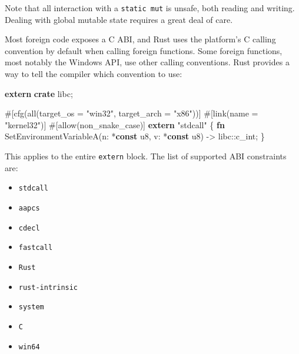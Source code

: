\documentclass[a4paper,]{book}
\newenvironment{Shaded}{\begin{snugshade}}{\end{snugshade}}
\newcommand{\KeywordTok}[1]{\textcolor[rgb]{0.13,0.29,0.53}{\textbf{{#1}}}}
\newcommand{\DataTypeTok}[1]{\textcolor[rgb]{0.13,0.29,0.53}{{#1}}}
\newcommand{\StringTok}[1]{\textcolor[rgb]{0.31,0.60,0.02}{{#1}}}
\newcommand{\AttributeTok}[1]{\textcolor[rgb]{0.77,0.63,0.00}{{#1}}}
\newcommand{\NormalTok}[1]{{#1}}
\providecommand{\tightlist}{%
  \setlength{\itemsep}{0pt}\setlength{\parskip}{0pt}}
\begin{document}
Note that all interaction with a \texttt{static\ mut} is unsafe, both
reading and writing. Dealing with global mutable state requires a great
deal of care.


Most foreign code exposes a C ABI, and Rust uses the platform's C
calling convention by default when calling foreign functions. Some
foreign functions, most notably the Windows API, use other calling
conventions. Rust provides a way to tell the compiler which convention
to use:

\begin{Shaded}
\begin{Highlighting}[]
\KeywordTok{extern} \KeywordTok{crate} \NormalTok{libc;}

\AttributeTok{#[}\NormalTok{cfg}\AttributeTok{(}\NormalTok{all}\AttributeTok{(}\NormalTok{target_os }\AttributeTok{=} \StringTok{"win32"}\AttributeTok{,} \NormalTok{target_arch }\AttributeTok{=} \StringTok{"x86"}\AttributeTok{))]}
\AttributeTok{#[}\NormalTok{link}\AttributeTok{(}\NormalTok{name }\AttributeTok{=} \StringTok{"kernel32"}\AttributeTok{)]}
\AttributeTok{#[}\NormalTok{allow}\AttributeTok{(}\NormalTok{non_snake_case}\AttributeTok{)]}
\KeywordTok{extern} \StringTok{"stdcall"} \NormalTok{\{}
    \KeywordTok{fn} \NormalTok{SetEnvironmentVariableA(n: *}\KeywordTok{const} \DataTypeTok{u8}\NormalTok{, v: *}\KeywordTok{const} \DataTypeTok{u8}\NormalTok{) -> libc::}\DataTypeTok{c_int}\NormalTok{;}
\NormalTok{\}}
\end{Highlighting}
\end{Shaded}

This applies to the entire \texttt{extern} block. The list of supported
ABI constraints are:

\begin{itemize}
\tightlist
\item
  \texttt{stdcall}
\item
  \texttt{aapcs}
\item
  \texttt{cdecl}
\item
  \texttt{fastcall}
\item
  \texttt{Rust}
\item
  \texttt{rust-intrinsic}
\item
  \texttt{system}
\item
  \texttt{C}
\item
  \texttt{win64}
\end{itemize}
\end{document}
